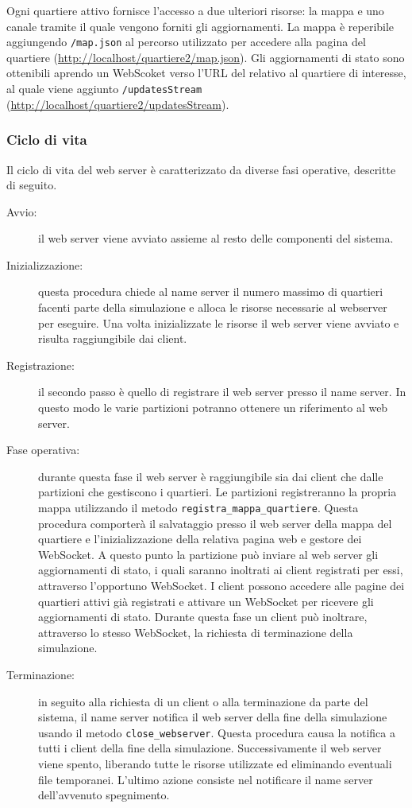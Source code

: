 Ogni quartiere attivo fornisce l'accesso a due ulteriori risorse: la mappa e uno
canale tramite il quale vengono forniti gli aggiornamenti.
La mappa è reperibile aggiungendo \texttt{/map.json} al percorso utilizzato per
accedere alla pagina del quartiere (\url{http://localhost/quartiere2/map.json}).
Gli aggiornamenti di stato sono ottenibili aprendo un WebScoket verso l'URL del
relativo al quartiere di interesse, al quale viene aggiunto
\texttt{/updatesStream} (\url{http://localhost/quartiere2/updatesStream}).

\subsubsection{Ciclo di vita}
Il ciclo di vita del web server è caratterizzato da diverse fasi operative,
descritte di seguito.

\begin{description}
	\item[Avvio:] il web server viene avviato assieme al resto delle componenti del
	sistema.
	\item[Inizializzazione:] questa procedura chiede al name server il numero
	massimo di quartieri facenti parte della simulazione e alloca le risorse
	necessarie al webserver per eseguire. Una volta inizializzate le risorse il web
	server viene avviato e risulta raggiungibile dai client.
	\item[Registrazione:] il secondo passo è quello di registrare il web server
	presso il name server. In questo modo le varie partizioni potranno ottenere un
	riferimento al web server.
	\item[Fase operativa:] durante questa fase il web server è raggiungibile sia
	dai client che dalle partizioni che gestiscono i quartieri. Le partizioni
	registreranno la propria mappa utilizzando il metodo
	\texttt{registra\_mappa\_quartiere}. Questa procedura comporterà il salvataggio
	presso il web server della mappa del quartiere e l'inizializzazione della
	relativa pagina web e gestore dei WebSocket. A questo punto la partizione può
	inviare al web server gli aggiornamenti di stato, i quali saranno inoltrati ai
	client registrati per essi, attraverso l'opportuno WebSocket.
	I client possono accedere alle pagine dei quartieri attivi già registrati e
	attivare un WebSocket per ricevere gli aggiornamenti di stato.
	Durante questa fase un client può inoltrare, attraverso lo stesso WebSocket, la
	richiesta di terminazione della simulazione.
	\item[Terminazione:] in seguito alla richiesta di un client o alla terminazione
	da parte del sistema, il name server notifica il web server della fine della
	simulazione usando il metodo \texttt{close\_webserver}. Questa procedura causa
	la notifica a tutti i client della fine della simulazione. Successivamente il
	web server viene spento, liberando tutte le risorse utilizzate ed eliminando
	eventuali file temporanei. L'ultimo azione consiste nel notificare il name
	server dell'avvenuto spegnimento.
\end{description}

